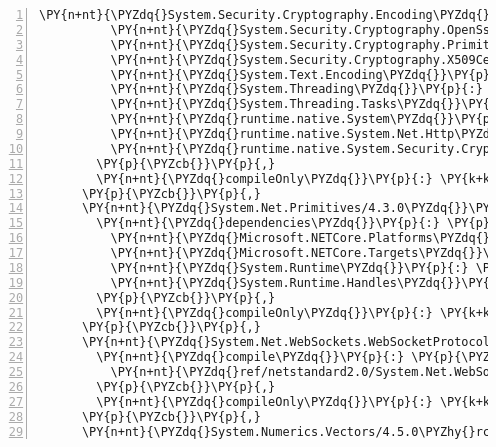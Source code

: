 \begin{Verbatim}[commandchars=\\\{\},numbers=left,firstnumber=1,stepnumber=1,numberblanklines=0]
          \PY{n+nt}{\PYZdq{}System.Security.Cryptography.Encoding\PYZdq{}}\PY{p}{:} \PY{l+s+s2}{\PYZdq{}4.3.0\PYZdq{}}\PY{p}{,}
          \PY{n+nt}{\PYZdq{}System.Security.Cryptography.OpenSsl\PYZdq{}}\PY{p}{:} \PY{l+s+s2}{\PYZdq{}4.3.0\PYZdq{}}\PY{p}{,}
          \PY{n+nt}{\PYZdq{}System.Security.Cryptography.Primitives\PYZdq{}}\PY{p}{:} \PY{l+s+s2}{\PYZdq{}4.3.0\PYZdq{}}\PY{p}{,}
          \PY{n+nt}{\PYZdq{}System.Security.Cryptography.X509Certificates\PYZdq{}}\PY{p}{:} \PY{l+s+s2}{\PYZdq{}4.3.0\PYZdq{}}\PY{p}{,}
          \PY{n+nt}{\PYZdq{}System.Text.Encoding\PYZdq{}}\PY{p}{:} \PY{l+s+s2}{\PYZdq{}4.3.0\PYZdq{}}\PY{p}{,}
          \PY{n+nt}{\PYZdq{}System.Threading\PYZdq{}}\PY{p}{:} \PY{l+s+s2}{\PYZdq{}4.3.0\PYZdq{}}\PY{p}{,}
          \PY{n+nt}{\PYZdq{}System.Threading.Tasks\PYZdq{}}\PY{p}{:} \PY{l+s+s2}{\PYZdq{}4.3.0\PYZdq{}}\PY{p}{,}
          \PY{n+nt}{\PYZdq{}runtime.native.System\PYZdq{}}\PY{p}{:} \PY{l+s+s2}{\PYZdq{}4.3.0\PYZdq{}}\PY{p}{,}
          \PY{n+nt}{\PYZdq{}runtime.native.System.Net.Http\PYZdq{}}\PY{p}{:} \PY{l+s+s2}{\PYZdq{}4.3.0\PYZdq{}}\PY{p}{,}
          \PY{n+nt}{\PYZdq{}runtime.native.System.Security.Cryptography.OpenSsl\PYZdq{}}\PY{p}{:} \PY{l+s+s2}{\PYZdq{}4.3.0\PYZdq{}}
        \PY{p}{\PYZcb{}}\PY{p}{,}
        \PY{n+nt}{\PYZdq{}compileOnly\PYZdq{}}\PY{p}{:} \PY{k+kc}{true}
      \PY{p}{\PYZcb{}}\PY{p}{,}
      \PY{n+nt}{\PYZdq{}System.Net.Primitives/4.3.0\PYZdq{}}\PY{p}{:} \PY{p}{\PYZob{}}
        \PY{n+nt}{\PYZdq{}dependencies\PYZdq{}}\PY{p}{:} \PY{p}{\PYZob{}}
          \PY{n+nt}{\PYZdq{}Microsoft.NETCore.Platforms\PYZdq{}}\PY{p}{:} \PY{l+s+s2}{\PYZdq{}2.1.0\PYZhy{}rc1\PYZdq{}}\PY{p}{,}
          \PY{n+nt}{\PYZdq{}Microsoft.NETCore.Targets\PYZdq{}}\PY{p}{:} \PY{l+s+s2}{\PYZdq{}2.1.0\PYZhy{}rc1\PYZdq{}}\PY{p}{,}
          \PY{n+nt}{\PYZdq{}System.Runtime\PYZdq{}}\PY{p}{:} \PY{l+s+s2}{\PYZdq{}4.3.0\PYZdq{}}\PY{p}{,}
          \PY{n+nt}{\PYZdq{}System.Runtime.Handles\PYZdq{}}\PY{p}{:} \PY{l+s+s2}{\PYZdq{}4.3.0\PYZdq{}}
        \PY{p}{\PYZcb{}}\PY{p}{,}
        \PY{n+nt}{\PYZdq{}compileOnly\PYZdq{}}\PY{p}{:} \PY{k+kc}{true}
      \PY{p}{\PYZcb{}}\PY{p}{,}
      \PY{n+nt}{\PYZdq{}System.Net.WebSockets.WebSocketProtocol/4.5.0\PYZhy{}rc1\PYZdq{}}\PY{p}{:} \PY{p}{\PYZob{}}
        \PY{n+nt}{\PYZdq{}compile\PYZdq{}}\PY{p}{:} \PY{p}{\PYZob{}}
          \PY{n+nt}{\PYZdq{}ref/netstandard2.0/System.Net.WebSockets.WebSocketProtocol.dll\PYZdq{}}\PY{p}{:} \PY{p}{\PYZob{}}\PY{p}{\PYZcb{}}
        \PY{p}{\PYZcb{}}\PY{p}{,}
        \PY{n+nt}{\PYZdq{}compileOnly\PYZdq{}}\PY{p}{:} \PY{k+kc}{true}
      \PY{p}{\PYZcb{}}\PY{p}{,}
      \PY{n+nt}{\PYZdq{}System.Numerics.Vectors/4.5.0\PYZhy{}rc1\PYZdq{}}\PY{p}{:} \PY{p}{\PYZob{}}

\end{Verbatim}
